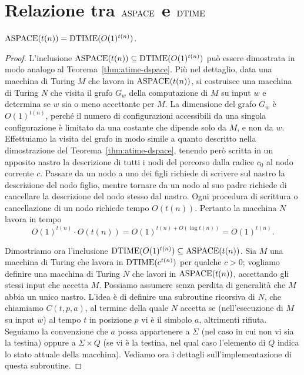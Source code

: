 \section{Relazione tra \texorpdfstring{$\operatorname{ASPACE}$}{ASPACE} e \texorpdfstring{$\operatorname{DTIME}$}{DTIME}}

\begin{teorema}
  \label{thm:aspace-dtime}
  $\operatorname{ASPACE}(t(n)) = \operatorname{DTIME}(O(1)^{t(n)})$.
\end{teorema}

\begin{proof}
  L'inclusione $\operatorname{ASPACE}(t(n)) \subseteq \operatorname{DTIME}(O(1)^{t(n)})$ può essere dimostrata in modo analogo al
  Teorema~\ref{thm:atime-dspace}. Più nel dettaglio, data una macchina di Turing $M$ che lavora in $\operatorname{ASPACE}(t(n))$,
  si costruisce una macchina di Turing $N$ che visita il grafo $G_w$ della computazione di $M$ su input $w$
  e determina se $w$ sia o meno accettante per $M$. La dimensione del grafo $G_w$ è $O(1)^{t(n)}$,
  perché il numero di configurazioni accessibili da una singola configurazione è limitato da una costante che dipende
  solo da $M$, e non da $w$.
  Effettuiamo la visita del grafo in modo simile a quanto descritto nella dimostrazione del Teorema~\ref{thm:atime-dspace}, tenendo però scritta in un apposito nastro la descrizione di tutti i nodi del percorso dalla radice $c_0$ al nodo corrente $c$.
  Passare da un nodo a uno dei figli richiede di scrivere sul nastro la descrizione del nodo figlio, mentre tornare da un nodo al suo padre richiede di cancellare la descrizione del nodo stesso dal nastro.
  Ogni procedura di scrittura o cancellazione di un nodo richiede tempo $O(t(n))$.
  Pertanto la macchina $N$ lavora in tempo
  \[ O(1)^{t(n)} \cdot O(t(n)) = O(1)^{ t(n) + O(\log t(n)) } = O(1)^{t(n)}. \]
  
  Dimostriamo ora l'inclusione $\operatorname{DTIME}(O(1)^{t(n)}) \subseteq \operatorname{ASPACE}(t(n))$.
  Sia $M$ una macchina di Turing che lavora in $\operatorname{DTIME}(c^{t(n)})$ per qualche $c>0$; vogliamo definire una macchina di Turing $N$ che lavori in $\operatorname{ASPACE}(t(n))$, accettando gli stessi input che accetta $M$.
  Possiamo assumere senza perdita di generalità che $M$ abbia un unico nastro.
  L'idea è di definire una subroutine ricorsiva di $N$, che chiamiamo $C(t,p,a)$, al termine della quale $N$ accetta se (nell'esecuzione di $M$ su input $w$) al tempo $t$ in posizione $p$ vi è il simbolo $a$, altrimenti rifiuta.
  Seguiamo la convenzione che $a$ possa appartenere a $\Sigma$ (nel caso in cui non vi sia la testina) oppure a $\Sigma\times Q$ (se vi è la testina, nel qual caso l'elemento di $Q$ indica lo stato attuale della macchina). Vediamo ora i dettagli sull'implementazione di questa subroutine.
  

\end{proof}
